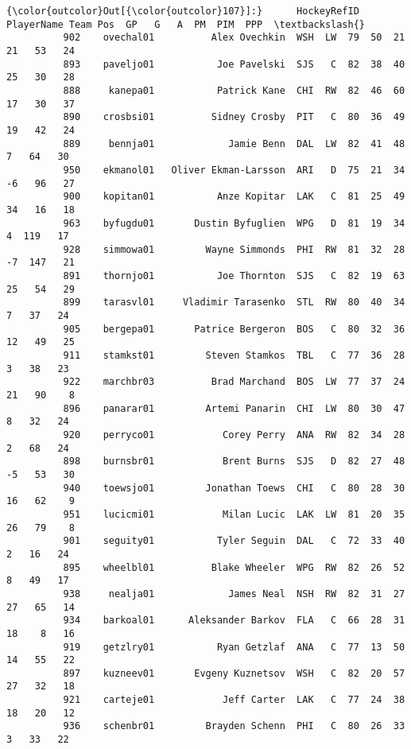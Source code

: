 \documentclass[11pt]{article}
\begin{document}
\begin{Verbatim}[commandchars=\\\{\}]
{\color{outcolor}Out[{\color{outcolor}107}]:}      HockeyRefID             PlayerName Team Pos  GP   G   A  PM  PIM  PPP  \textbackslash{}
          902    ovechal01          Alex Ovechkin  WSH  LW  79  50  21  21   53   24   
          893    paveljo01           Joe Pavelski  SJS   C  82  38  40  25   30   28   
          888     kanepa01           Patrick Kane  CHI  RW  82  46  60  17   30   37   
          890    crosbsi01          Sidney Crosby  PIT   C  80  36  49  19   42   24   
          889     bennja01             Jamie Benn  DAL  LW  82  41  48   7   64   30   
          950    ekmanol01   Oliver Ekman-Larsson  ARI   D  75  21  34  -6   96   27   
          900    kopitan01           Anze Kopitar  LAK   C  81  25  49  34   16   18   
          963    byfugdu01       Dustin Byfuglien  WPG   D  81  19  34   4  119   17   
          928    simmowa01         Wayne Simmonds  PHI  RW  81  32  28  -7  147   21   
          891    thornjo01           Joe Thornton  SJS   C  82  19  63  25   54   29   
          899    tarasvl01     Vladimir Tarasenko  STL  RW  80  40  34   7   37   24   
          905    bergepa01       Patrice Bergeron  BOS   C  80  32  36  12   49   25   
          911    stamkst01         Steven Stamkos  TBL   C  77  36  28   3   38   23   
          922    marchbr03          Brad Marchand  BOS  LW  77  37  24  21   90    8   
          896    panarar01         Artemi Panarin  CHI  LW  80  30  47   8   32   24   
          920    perryco01            Corey Perry  ANA  RW  82  34  28   2   68   24   
          898    burnsbr01            Brent Burns  SJS   D  82  27  48  -5   53   30   
          940    toewsjo01         Jonathan Toews  CHI   C  80  28  30  16   62    9   
          951    lucicmi01            Milan Lucic  LAK  LW  81  20  35  26   79    8   
          901    seguity01           Tyler Seguin  DAL   C  72  33  40   2   16   24   
          895    wheelbl01          Blake Wheeler  WPG  RW  82  26  52   8   49   17   
          938     nealja01             James Neal  NSH  RW  82  31  27  27   65   14   
          934    barkoal01      Aleksander Barkov  FLA   C  66  28  31  18    8   16   
          919    getzlry01           Ryan Getzlaf  ANA   C  77  13  50  14   55   22   
          897    kuzneev01       Evgeny Kuznetsov  WSH   C  82  20  57  27   32   18   
          921    carteje01            Jeff Carter  LAK   C  77  24  38  18   20   12   
          936    schenbr01         Brayden Schenn  PHI   C  80  26  33   3   33   22   

\end{Verbatim}
\end{document}

